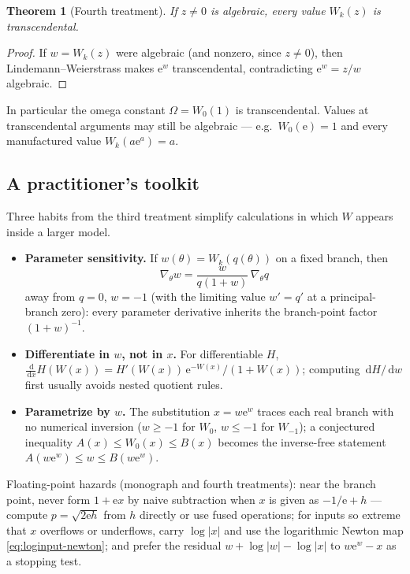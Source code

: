 \documentclass[11pt]{article}
\newtheorem{theorem}{Theorem}[section]
\theoremstyle{remark}
\newcommand{\ee}{\mathrm e}
\newcommand{\abs}[1]{\left|#1\right|}
\newcommand{\dd}{\,\mathrm d}
\begin{document}
\begin{theorem}[Fourth treatment]\label{cmp:thm:transcendence}
If \(z\ne0\) is algebraic, every value \(W_k(z)\) is transcendental.
\end{theorem}

\begin{proof}
If \(w=W_k(z)\) were algebraic (and nonzero, since \(z\ne0\)), then
Lindemann--Weierstrass makes \(\ee^w\) transcendental, contradicting
\(\ee^w=z/w\) algebraic.
\end{proof}

In particular the omega constant \(\Omega=W_0(1)\) is transcendental.
Values at transcendental arguments may still be algebraic --- e.g.\
\(W_0(\ee)=1\) and every manufactured value \(W_k(a\ee^a)=a\).

\subsection{A practitioner's toolkit}

Three habits from the third treatment simplify calculations in which \(W\)
appears inside a larger model.

\begin{itemize}
\item\textbf{Parameter sensitivity.}  If
\(w(\theta)=W_k(q(\theta))\) on a fixed branch, then
\[
 \nabla_\theta w=\frac{w}{q(1+w)}\,\nabla_\theta q
\]
away from \(q=0\), \(w=-1\) (with the limiting value
\(w'=q'\) at a principal-branch zero): every parameter derivative inherits
the branch-point factor \((1+w)^{-1}\).
\item\textbf{Differentiate in \(w\), not in \(x\).}  For differentiable
\(H\),
\(\tfrac{\dd}{\dd x}H(W(x))=H'(W(x))\,\ee^{-W(x)}/(1+W(x))\); computing
\(\dd H/\dd w\) first usually avoids nested quotient rules.
\item\textbf{Parametrize by \(w\).}  The substitution \(x=w\ee^w\) traces
each real branch with no numerical inversion (\(w\ge-1\) for \(W_0\),
\(w\le-1\) for \(W_{-1}\)); a conjectured inequality
\(A(x)\le W_0(x)\le B(x)\) becomes the inverse-free statement
\(A(w\ee^w)\le w\le B(w\ee^w)\).
\end{itemize}

Floating-point hazards (monograph and fourth treatments): near the branch
point, never form \(1+\ee x\) by naive subtraction when \(x\) is given as
\(-1/\ee+h\) --- compute \(p=\sqrt{2\ee h}\) from \(h\) directly or use
fused operations; for inputs so extreme that \(x\) overflows or underflows,
carry \(\log\abs x\) and use the logarithmic Newton map
\eqref{eq:loginput-newton}; and prefer the residual
\(w+\log\abs w-\log\abs x\) to \(w\ee^w-x\) as a stopping test.
\end{document}
